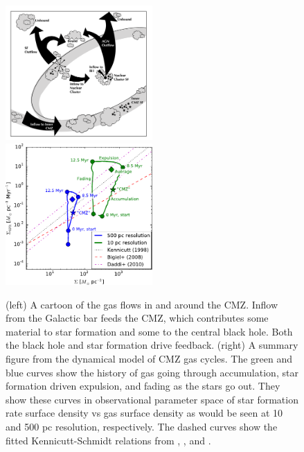 \documentclass[modern]{aastex62}
\begin{document}
\begin{figure}[htp]
    \includegraphics[width=0.5\textwidth]{White_paper_v4.1.pdf}
    \includegraphics[width=0.5\textwidth]{Krumholz2015_fig16left.pdf}
    \caption{(left) A cartoon of the gas flows in and around the CMZ.
    Inflow from the Galactic bar feeds the CMZ, which contributes
    some material to star formation and some to the central black hole.
    Both the black hole and star formation drive feedback. (right)
    A summary figure from the \citet{Krumholz2015b} dynamical model
    of CMZ gas cycles.  The green and blue curves show the history
    of gas going through accumulation, star formation driven expulsion,
    and fading as the stars go out.  They show these curves in observational
    parameter space of star formation rate surface density vs gas surface
    density as would be seen at 10 and 500 pc resolution, respectively.
    The dashed curves show the fitted Kennicutt-Schmidt relations
    from \citet{Kennicutt1998a}, \citet{Bigiel2008a}, and \citet{Daddi2010a}.}
\end{figure}
\end{document}
